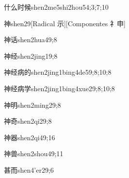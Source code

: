 \begin{verbete}{什么时候}{shen2me5shi2hou5}{4;3;7;10}
\end{verbete}

\begin{verbete}{神}{shen2}{9}[Radical 示][Componentes 礻申]
\end{verbete}

\begin{verbete}{神话}{shen2hua4}{9;8}
\end{verbete}

\begin{verbete}{神经}{shen2jing1}{9;8}
\end{verbete}

\begin{verbete}{神经病的}{shen2jing1bing4de5}{9;8;10;8}
\end{verbete}

\begin{verbete}{神经病学}{shen2jing1bing4xue2}{9;8;10;8}
\end{verbete}

\begin{verbete}{神明}{shen2ming2}{9;8}
\end{verbete}

\begin{verbete}{神奇}{shen2qi2}{9;8}
\end{verbete}

\begin{verbete}{神器}{shen2qi4}{9;16}
\end{verbete}

\begin{verbete}{神兽}{shen2shou4}{9;11}
\end{verbete}

\begin{verbete}{甚而}{shen4'er2}{9;6}
\end{verbete}


